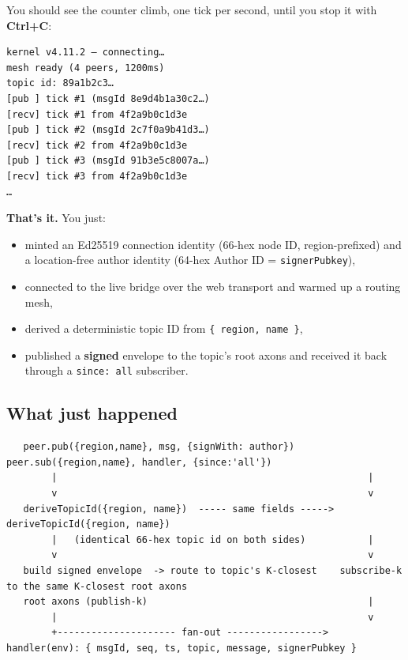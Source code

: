 \documentclass[
  nobib]{tufte-handout}
\providecommand{\tightlist}{%
  \setlength{\itemsep}{0pt}\setlength{\parskip}{0pt}}
\begin{document}
You should see the counter climb, one tick per second, until you stop it
with \textbf{Ctrl+C}:

\begin{verbatim}
kernel v4.11.2 — connecting…
mesh ready (4 peers, 1200ms)
topic id: 89a1b2c3…
[pub ] tick #1 (msgId 8e9d4b1a30c2…)
[recv] tick #1 from 4f2a9b0c1d3e
[pub ] tick #2 (msgId 2c7f0a9b41d3…)
[recv] tick #2 from 4f2a9b0c1d3e
[pub ] tick #3 (msgId 91b3e5c8007a…)
[recv] tick #3 from 4f2a9b0c1d3e
…
\end{verbatim}

\textbf{That's it.} You just:

\begin{itemize}
\tightlist
\item
  minted an Ed25519 connection identity (66-hex node ID,
  region-prefixed) and a location-free author identity (64-hex Author ID
  = \texttt{signerPubkey}),
\item
  connected to the live bridge over the web transport and warmed up a
  routing mesh,
\item
  derived a deterministic topic ID from \texttt{\{\ region,\ name\ \}},
\item
  published a \textbf{signed} envelope to the topic's root axons and
  received it back through a
  \texttt{since:\ \textquotesingle{}all\textquotesingle{}} subscriber.
\end{itemize}

\subsection{What just happened}\label{what-just-happened}

\begin{verbatim}
   peer.pub({region,name}, msg, {signWith: author})        peer.sub({region,name}, handler, {since:'all'})
        |                                                       |
        v                                                       v
   deriveTopicId({region, name})  ----- same fields ----->  deriveTopicId({region, name})
        |   (identical 66-hex topic id on both sides)           |
        v                                                       v
   build signed envelope  -> route to topic's K-closest    subscribe-k to the same K-closest root axons
   root axons (publish-k)                                       |
        |                                                       v
        +--------------------- fan-out ----------------->  handler(env): { msgId, seq, ts, topic, message, signerPubkey }
\end{verbatim}
\end{document}
